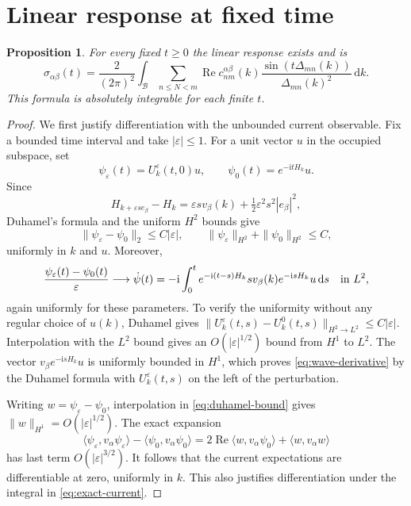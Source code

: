 \documentclass[11pt,a4paper]{article}
\numberwithin{equation}{section}
\newcommand{\cB}{\mathcal B}
\newcommand{\dd}{\,\mathrm d}
\newcommand{\ii}{\mathrm i}
\DeclareMathOperator{\Rea}{Re}
\newtheorem{proposition}[theorem]{Proposition}
\theoremstyle{remark}
\begin{document}
\section{Linear response at fixed time}

\begin{proposition}\label{prop:response}
For every fixed $t\geq0$ the linear response exists and is
\begin{equation}\label{eq:response}
 \sigma_{\alpha\beta}(t)
   =\frac{2}{(2\pi)^2}\int_{\cB}
       \sum_{n\leq N<m}\Rea c_{nm}^{\alpha\beta}(k)
       \frac{\sin(t\Delta_{mn}(k))}{\Delta_{mn}(k)^2}\dd k.
\end{equation}
This formula is absolutely integrable for each finite $t$.
\end{proposition}

\begin{proof}
We first justify differentiation with the unbounded current observable.
Fix a bounded time interval and take $|\varepsilon|\leq1$. For a unit
vector $u$ in the occupied subspace, set
\[
 \psi_\varepsilon(t)=U_k^\varepsilon(t,0)u,\qquad
 \psi_0(t)=e^{-\ii tH_k}u.
\]
Since
\begin{equation}\label{eq:perturbation}
 H_{k+\varepsilon s e_\beta}-H_k
       =\varepsilon s v_\beta(k)
          +\tfrac12\varepsilon^2s^2|e_\beta|^2,
\end{equation}
Duhamel's formula and the uniform $H^2$ bounds give
\begin{equation}\label{eq:duhamel-bound}
 \|\psi_\varepsilon-\psi_0\|_2\leq C|\varepsilon|,
 \qquad
 \|\psi_\varepsilon\|_{H^2}+\|\psi_0\|_{H^2}\leq C,
\end{equation}
uniformly in $k$ and $u$. Moreover,
\begin{equation}\label{eq:wave-derivative}
 \frac{\psi_\varepsilon(t)-\psi_0(t)}{\varepsilon}
   \longrightarrow
 \dot\psi(t)=-\ii\int_0^t
       e^{-\ii(t-s)H_k}s v_\beta(k)e^{-\ii sH_k}u\dd s
 \quad\hbox{in }L^2,
\end{equation}
again uniformly for these parameters. To verify the uniformity without
any regular choice of $u(k)$, Duhamel gives
$\|U_k^\varepsilon(t,s)-U_k^0(t,s)\|_{H^2\to L^2}
\leq C|\varepsilon|$.
Interpolation with the $L^2$ bound gives an $O(|\varepsilon|^{1/2})$
bound from $H^1$ to $L^2$. The vector
$v_\beta e^{-\ii sH_k}u$ is uniformly bounded in $H^1$, which proves
\eqref{eq:wave-derivative} by the Duhamel formula with
$U_k^\varepsilon(t,s)$ on the left of the perturbation.

Writing $w=\psi_\varepsilon-\psi_0$, interpolation in
\eqref{eq:duhamel-bound} gives $\|w\|_{H^1}=O(|\varepsilon|^{1/2})$.
The exact expansion
\[
 \langle\psi_\varepsilon,v_\alpha\psi_\varepsilon\rangle
 -\langle\psi_0,v_\alpha\psi_0\rangle
 =2\Rea\langle w,v_\alpha\psi_0\rangle
      +\langle w,v_\alpha w\rangle
\]
has last term $O(|\varepsilon|^{3/2})$. It follows that the current
expectations are differentiable at zero, uniformly in $k$. This also
justifies differentiation under the integral in
\eqref{eq:exact-current}.


\end{proof}
\end{document}
